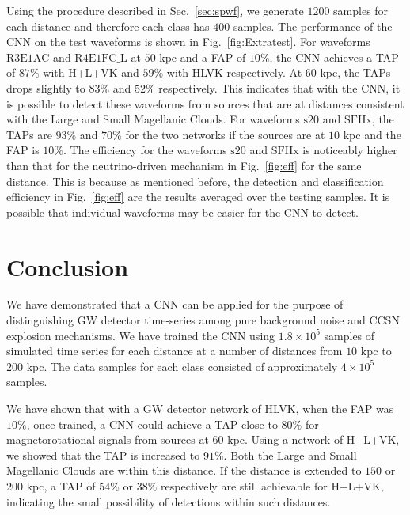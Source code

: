 \documentclass[aps,twocolumn,showpacs,groupedaddress, nofootinbib]{revtex4}  %
\begin{document}
%
%
Using the procedure described in Sec.~\ref{sec:spwf}, we generate $1200$
samples for each distance and therefore each class has $400$
samples. The performance of the \ac{CNN} on the test waveforms is shown in
Fig.~\ref{fig:Extratest}. For waveforms $\text{R3E1AC}$ and $\text{R4E1FC\_L}$
at $50$ kpc and a \ac{FAP} of $10\%$, the \ac{CNN} achieves a \ac{TAP} of $87\%$
with H+L+VK and $59\%$ with HLVK respectively. At $60$ kpc, the \acp{TAP} drops
slightly to $83\%$ and $52\%$ respectively. This indicates that with the
\ac{CNN}, it is possible to detect these waveforms from sources that are at
distances consistent with the Large and Small Magellanic Clouds. For waveforms
$\text{s}20$ and $\text{SFHx}$, the \acp{TAP} are $93\%$ and $70\%$ for the two
networks if the sources are at $10$ kpc and the \ac{FAP} is $10\%$.  The
efficiency for the waveforms $\text{s}20$ and $\text{SFHx}$ is noticeably
higher than that for the neutrino-driven mechanism in Fig.~\ref{fig:eff} for
the same distance. This is because as mentioned before, the detection and
classification efficiency in Fig.~\ref{fig:eff} are the results averaged over
the testing samples. It is possible that individual waveforms may be easier for
the \ac{CNN} to detect. 
\section{Conclusion}\label{sec:conclusion}
%
%
We have demonstrated that a \ac{CNN} can be applied for the purpose of
distinguishing \ac{GW} detector time-series among pure background noise and
\ac{CCSN} explosion mechanisms. We have trained the \ac{CNN} using
$1.8\times10^{5}$ samples of simulated time series for each distance at a
number of distances from $10$ kpc to $200$ kpc. The data samples for each
class consisted of approximately $4\times10^5$ samples. 

%
%
We have shown that with a \ac{GW} detector network of HLVK, when the \ac{FAP}
was $10\%$, once trained, a \ac{CNN} could achieve a \ac{TAP} close to $80\%$
for magnetorotational signals from sources at $60$ kpc. Using a network of
H+L+VK, we showed that the \ac{TAP} is increased to $91\%$.  Both the Large and
Small Magellanic Clouds are within this distance. If the distance is extended
to $150$ or $200$ kpc, a \ac{TAP} of $54\%$ or $38\%$ respectively are still
achievable for H+L+VK, indicating the small possibility of detections within
such distances. 
\end{document}
